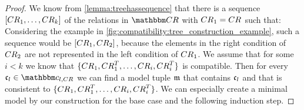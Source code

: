 \begin{proof}
    We know from \autoref{lemma:treehassequence} that there is a sequence $\sequenced{\consistencyrelation{CR}{1}, \dots, \consistencyrelation{CR}{k}}$ of the relations in $\consistencyrelationset{CR}$ with $\consistencyrelation{CR}{1} = \consistencyrelation{CR}{}$ such that:
    Considering the example in \autoref{fig:compatibility:tree_construction_example}, such a sequence would be $\sequenced{\consistencyrelation{CR}{1}, \consistencyrelation{CR}{2}}$, because the elements in the right condition of $\consistencyrelation{CR}{2}$ are not represented in the left condition of $\consistencyrelation{CR}{1}$.
    We assume that for some $i < k$ we know that $\setted{\consistencyrelation{CR}{1}, \consistencyrelation{CR}{1}^T, \dots, \consistencyrelation{CR}{i}, \consistencyrelation{CR}{i}^T}$ is compatible.
    Then for every $\conditionelement{c}{l} \in \condition{C}{l,\consistencyrelation{CR}{}}$ we can find a model tuple $\modeltuple{m}$ that contains $\conditionelement{c}{l}$ and that is consistent to $\setted{\consistencyrelation{CR}{1}, \consistencyrelation{CR}{1}^T, \dots, \consistencyrelation{CR}{i}, \consistencyrelation{CR}{i}^T}$.
    We can especially create a minimal model by our construction for the base case and the following induction step.
    

\end{proof}

